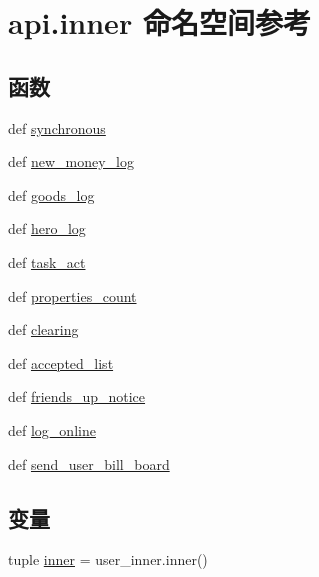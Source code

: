\hypertarget{namespaceapi_1_1inner}{\section{api.\-inner 命名空间参考}
\label{namespaceapi_1_1inner}
}
\subsection*{函数}
\begin{DoxyCompactItemize}
\item 
def \hyperlink{namespaceapi_1_1inner_a0a33f846e18a58f1283309ac49d57edc}{synchronous}
\item 
def \hyperlink{namespaceapi_1_1inner_aa9a568eadd623549f0fca2d73f934f84}{new\-\_\-money\-\_\-log}
\item 
def \hyperlink{namespaceapi_1_1inner_ac9ce567a4d355c78c0f59bc6227caf50}{goods\-\_\-log}
\item 
def \hyperlink{namespaceapi_1_1inner_a9cb9cf17075b8063b13c2a603809065d}{hero\-\_\-log}
\item 
def \hyperlink{namespaceapi_1_1inner_ab73a02b6fc41362e2fee286a877e7e1a}{task\-\_\-act}
\item 
def \hyperlink{namespaceapi_1_1inner_a5dfa9d867b82432b6becbbb65a1405df}{properties\-\_\-count}
\item 
def \hyperlink{namespaceapi_1_1inner_a9a2fef02f0cc97031ffb10a9f1534e62}{clearing}
\item 
def \hyperlink{namespaceapi_1_1inner_affc9d6301672f5fbc4c1c6bed367565a}{accepted\-\_\-list}
\item 
def \hyperlink{namespaceapi_1_1inner_a6cdb7bef0bb4fa49ee71e7380033e2aa}{friends\-\_\-up\-\_\-notice}
\item 
def \hyperlink{namespaceapi_1_1inner_aeb3244dde5cad676647d3af3b63b63ff}{log\-\_\-online}
\item 
def \hyperlink{namespaceapi_1_1inner_a99eca85d73e5e07aa42061c596e240e6}{send\-\_\-user\-\_\-bill\-\_\-board}
\end{DoxyCompactItemize}
\subsection*{变量}
\begin{DoxyCompactItemize}
\item 
tuple \hyperlink{namespaceapi_1_1inner_a0526a93478a6286d3597c77c7e5cd710}{inner} = user\-\_\-inner.\-inner()
\end{DoxyCompactItemize}


